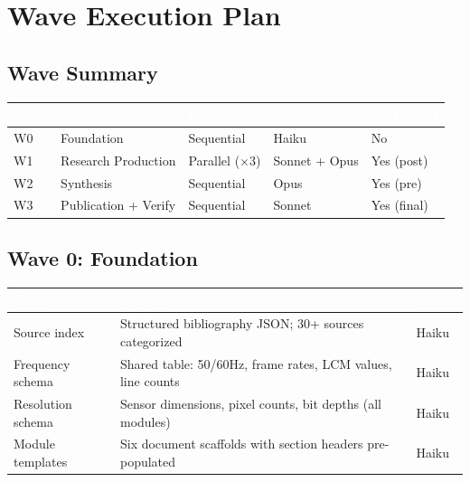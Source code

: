\documentclass[11pt,letterpaper]{article}
\newcommand{\tableheader}[1]{\textbf{\sffamily\textcolor{white}{#1}}}
\begin{document}
\section{Wave Execution Plan}

\subsection{Wave Summary}

\begin{center}
\begin{tabularx}{\textwidth}{C{1cm}L{3cm}C{2cm}C{2cm}C{2cm}}
\toprule
{}
\tableheader{Wave} & \tableheader{Name} & \tableheader{Execution} & \tableheader{Model} & \tableheader{CAPCOM} \\
\midrule
W0 & Foundation & Sequential & Haiku & No \\
W1 & Research Production & Parallel ($\times$3) & Sonnet + Opus & Yes (post) \\
W2 & Synthesis & Sequential & Opus & Yes (pre) \\
W3 & Publication + Verify & Sequential & Sonnet & Yes (final) \\
\bottomrule
\end{tabularx}
\end{center}

\subsection{Wave 0: Foundation}

\begin{center}
\begin{tabularx}{\textwidth}{L{3cm}XC{2cm}}
\toprule
{}
\tableheader{Task} & \tableheader{Output} & \tableheader{Model} \\
\midrule
Source index & Structured bibliography JSON; 30+ sources categorized & Haiku \\
Frequency schema & Shared table: 50/60Hz, frame rates, LCM values, line counts & Haiku \\
Resolution schema & Sensor dimensions, pixel counts, bit depths (all modules) & Haiku \\
Module templates & Six document scaffolds with section headers pre-populated & Haiku \\
\bottomrule
\end{tabularx}
\end{center}
\end{document}
